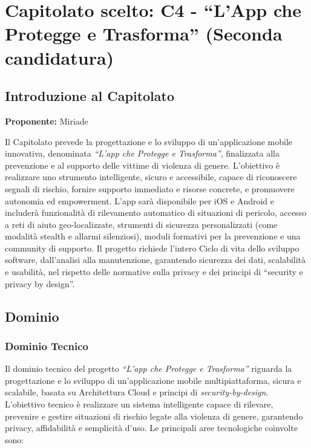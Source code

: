 \documentclass[a4paper,12pt]{article}
\begin{document}
\section{Capitolato scelto: C4 - ``L'App che Protegge e Trasforma'' (Seconda candidatura)}

\subsection{Introduzione al Capitolato}
\textbf{Proponente:} Miriade

Il Capitolato prevede la progettazione e lo sviluppo di un’applicazione mobile innovativa, denominata \textit{“L’app che Protegge e Trasforma”}, finalizzata alla prevenzione e al supporto delle vittime di violenza di genere. L’obiettivo è realizzare uno strumento intelligente, sicuro e accessibile, capace di riconoscere segnali di rischio, fornire supporto immediato e risorse concrete, e promuovere autonomia ed empowerment.
L’app sarà disponibile per iOS e Android e includerà funzionalità di rilevamento automatico di situazioni di pericolo, accesso a reti di aiuto geo-localizzate, strumenti di sicurezza personalizzati (come modalità stealth e allarmi silenziosi), moduli formativi per la prevenzione e una community di supporto.
Il progetto richiede l’intero Ciclo di vita dello sviluppo software, dall’analisi alla manutenzione, garantendo sicurezza dei dati, scalabilità e usabilità, nel rispetto delle normative sulla privacy e dei principi di “security e privacy by design”.

\subsection{Dominio}

\subsubsection{Dominio Tecnico}
Il dominio tecnico del progetto \textit{“L’app che Protegge e Trasforma”} riguarda la progettazione e lo sviluppo di un’applicazione mobile multipiattaforma, sicura e scalabile, basata su Architettura Cloud e principi di \textit{security-by-design}. L’obiettivo tecnico è realizzare un sistema intelligente capace di rilevare, prevenire e gestire situazioni di rischio legate alla violenza di genere, garantendo privacy, affidabilità e semplicità d’uso.
Le principali aree tecnologiche coinvolte sono:
\end{document}

